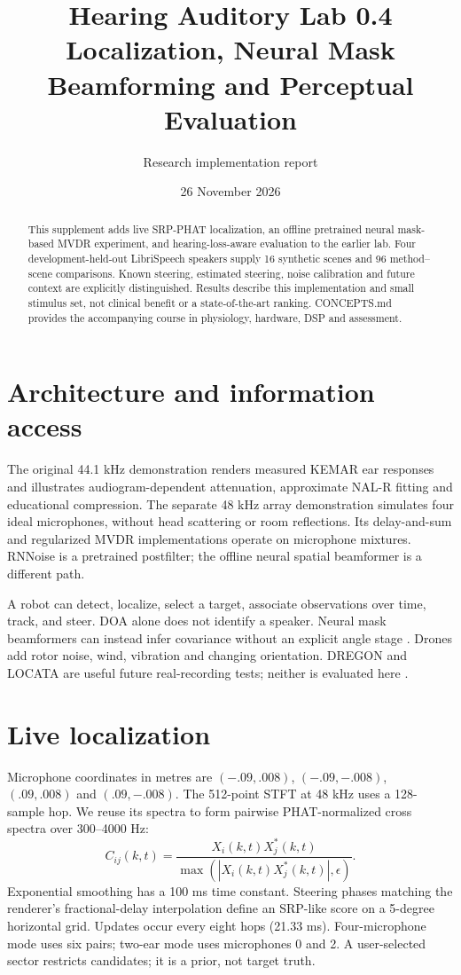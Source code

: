 \documentclass[10pt,a4paper]{article}
\title{Hearing Auditory Lab 0.4\\Localization, Neural Mask Beamforming and Perceptual Evaluation}
\author{Research implementation report}
\date{26 November 2026}
\begin{document}
\maketitle
\begin{abstract}
This supplement adds live SRP-PHAT localization, an offline pretrained neural mask-based MVDR experiment, and hearing-loss-aware evaluation to the earlier lab. Four development-held-out LibriSpeech speakers supply 16 synthetic scenes and 96 method--scene comparisons. Known steering, estimated steering, noise calibration and future context are explicitly distinguished. Results describe this implementation and small stimulus set, not clinical benefit or a state-of-the-art ranking. CONCEPTS.md provides the accompanying course in physiology, hardware, DSP and assessment.
\end{abstract}
\section{Architecture and information access}
The original 44.1 kHz demonstration renders measured KEMAR ear responses and illustrates audiogram-dependent attenuation, approximate NAL-R fitting and educational compression. The separate 48 kHz array demonstration simulates four ideal microphones, without head scattering or room reflections. Its delay-and-sum and regularized MVDR implementations operate on microphone mixtures. RNNoise is a pretrained postfilter; the offline neural spatial beamformer is a different path.

A robot can detect, localize, select a target, associate observations over time, track, and steer. DOA alone does not identify a speaker. Neural mask beamformers can instead infer covariance without an explicit angle stage \cite{heymann,souden}. Drones add rotor noise, wind, vibration and changing orientation. DREGON and LOCATA are useful future real-recording tests; neither is evaluated here \cite{dregon,locata}.

\section{Live localization}
Microphone coordinates in metres are $(-.09,.008)$, $(-.09,-.008)$, $(.09,.008)$ and $(.09,-.008)$. The 512-point STFT at 48 kHz uses a 128-sample hop. We reuse its spectra to form pairwise PHAT-normalized cross spectra over 300--4000 Hz:
\[
 C_{ij}(k,t)=\frac{X_i(k,t)X_j^*(k,t)}{\max(|X_i(k,t)X_j^*(k,t)|,\epsilon)}.
\]
Exponential smoothing has a 100 ms time constant. Steering phases matching the renderer's fractional-delay interpolation define an SRP-like score on a 5-degree horizontal grid. Updates occur every eight hops (21.33 ms). Four-microphone mode uses six pairs; two-ear mode uses microphones 0 and 2. A user-selected sector restricts candidates; it is a prior, not target truth.
\end{document}
